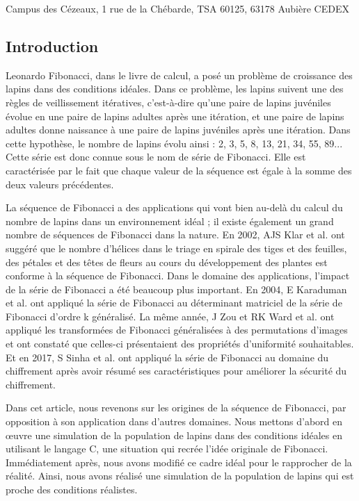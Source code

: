 \documentclass[12pt]{article}
\begin{document}
    \vspace{1cm}
    \begin{center}
        \begin{small}
            Campus des Cézeaux, 1 rue de la Chébarde, TSA 60125, 63178 Aubière CEDEX
        \end{small}
    \end{center}
    \thispagestyle{empty}
    \newpage
    \begin{center}
    \section*{Introduction}    
    \end{center}
    \par
    Leonardo Fibonacci, dans le livre de calcul\cite{Sigler:2002:FLA}, a posé un problème de croissance des lapins dans des conditions idéales. Dans ce problème, les lapins suivent une des règles de veillissement itératives, c'est-à-dire qu'une paire de lapins juvéniles évolue en une paire de lapins adultes après une itération, et une paire de lapins adultes donne naissance à une paire de lapins juvéniles après une itération. Dans cette hypothèse, le nombre de lapins évolu ainsi : 2, 3, 5, 8, 13, 21, 34, 55, 89... Cette série est donc connue sous le nom de série de Fibonacci. Elle est caractérisée par le fait que chaque valeur de la séquence est égale à la somme des deux valeurs précédentes.
    \par La séquence de Fibonacci a des applications qui vont bien au-delà du calcul du nombre de lapins dans un environnement idéal ; il existe également un grand nombre de séquences de Fibonacci dans la nature\cite{minarova2014fibonacci}. En 2002, AJS Klar et al. ont suggéré que le nombre d'hélices dans le triage en spirale des tiges et des feuilles, des pétales et des têtes de fleurs au cours du développement des plantes est conforme à la séquence de Fibonacci\cite{klar2002plant}. Dans le domaine des applications, l'impact de la série de Fibonacci a été beaucoup plus important. En 2004, E Karaduman et al. ont appliqué la série de Fibonacci au déterminant matriciel de la série de Fibonacci d'ordre k généralisé\cite{karaduman2004application}. La même année, J Zou et RK Ward et al. ont appliqué les transformées de Fibonacci généralisées à des permutations d'images et ont constaté que celles-ci présentaient des propriétés d'uniformité souhaitables\cite{zou2004generalized}. Et en 2017, S Sinha et al. ont appliqué la série de Fibonacci au domaine du chiffrement après avoir résumé ses caractéristiques pour améliorer la sécurité du chiffrement\cite{sinha2017fibonacci}.
    \par Dans cet article, nous revenons sur les origines de la séquence de Fibonacci, par opposition à son application dans d'autres domaines. Nous mettons d'abord en œuvre une simulation de la population de lapins dans des conditions idéales en utilisant le langage C, une situation qui recrée l'idée originale de Fibonacci. Immédiatement après, nous avons modifié ce cadre idéal pour le rapprocher de la réalité. Ainsi, nous avons réalisé une simulation de la population de lapins qui est proche des conditions réalistes.
    \newpage
	\tableofcontents
    
\end{document}
